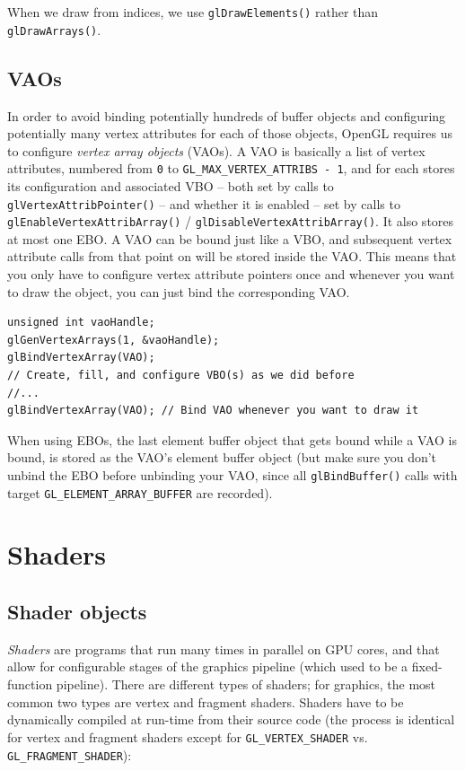 \documentclass[table, xcdraw]{article}%
\begin{document}
When we draw from indices, we use \texttt{glDrawElements()} rather than \texttt{glDrawArrays()}.

\subsection{VAOs} \label{vaos}

In order to avoid binding potentially hundreds of buffer objects and configuring potentially many vertex attributes for each of those objects, OpenGL requires us to configure \emph{vertex array objects} (VAOs). A VAO is basically a list of vertex attributes, numbered from \texttt{0} to \texttt{GL_MAX_VERTEX_ATTRIBS - 1}, and for each stores its configuration and associated VBO -- both set by calls to \texttt{glVertexAttribPointer()} -- and whether it is enabled -- set by calls to \texttt{glEnableVertexAttribArray()} / \texttt{glDisableVertexAttribArray()}. It also stores at most one EBO. A VAO can be bound just like a VBO, and subsequent vertex attribute calls from that point on will be stored inside the VAO. This means that you only have to configure vertex attribute pointers once and whenever you want to draw the object, you can just bind the corresponding VAO.

\begin{verbatim}
unsigned int vaoHandle;
glGenVertexArrays(1, &vaoHandle);
glBindVertexArray(VAO);
// Create, fill, and configure VBO(s) as we did before
//...
glBindVertexArray(VAO); // Bind VAO whenever you want to draw it
\end{verbatim}

When using EBOs, the last element buffer object that gets bound while a VAO is bound, is stored as the VAO's element buffer object (but make sure you don't unbind the EBO before unbinding your VAO, since all \texttt{glBindBuffer()} calls with target \texttt{GL_ELEMENT_ARRAY_BUFFER} are recorded).

\section{Shaders}

\subsection{Shader objects}

\emph{Shaders} are programs that run many times in parallel on GPU cores, and that allow for configurable stages of the graphics pipeline (which used to be a fixed-function pipeline). There are different types of shaders; for graphics, the most common two types are vertex and fragment shaders. Shaders have to be dynamically compiled at run-time from their source code (the process is identical for vertex and fragment shaders except for \texttt{GL_VERTEX_SHADER} vs. \texttt{GL_FRAGMENT_SHADER}):
\end{document}
